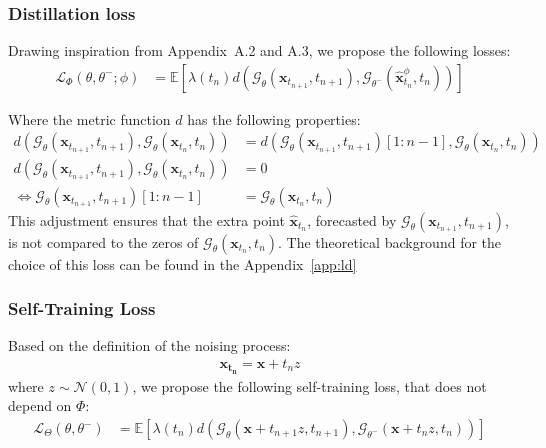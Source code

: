 \subsubsection{Distillation loss}
\noindent Drawing inspiration from \cite{song2023consistencymodels} Appendix~A.2 and A.3, we propose the following losses:
\begin{align}
    \mathcal{L}_{\Phi} \left(\theta, \theta^-; \phi \right) &= \mathbb{E}\left[ \lambda(t_n) d \left(\mathcal{G}_{\theta} (\mathbf{x}_{t_{n+1}}, t_{n+1}), \mathcal{G}_{\theta^-} (\widehat{\mathbf{x}}_{t_{n}}^{\phi}, t_{n}) \right)\right] \label{def:loss}
\end{align}

\noindent Where the metric function $d$ has the following properties:
\begin{align}
        d\left(\mathcal{G}_{\theta} (\mathbf{x}_{t_{n+1}}, t_{n+1}), \mathcal{G}_{\theta} (\mathbf{x}_{t_{n}}, t_{n})\right) &= d\left(\mathcal{G}_{\theta} (\mathbf{x}_{t_{n+1}}, t_{n+1})[1:n-1], \mathcal{G}_{\theta} (\mathbf{x}_{t_{n}}, t_{n})\right) \label{d:prop} \\
         d\left(\mathcal{G}_{\theta} (\mathbf{x}_{t_{n+1}}, t_{n+1}), \mathcal{G}_{\theta} (\mathbf{x}_{t_{n}}, t_{n})\right) & = 0 \\\Leftrightarrow \mathcal{G}_{\theta} (\mathbf{x}_{t_{n+1}}, t_{n+1})[1:n-1] & = \mathcal{G}_{\theta} (\mathbf{x}_{t_{n}}, t_{n})  \label{d:zero}
\end{align}
\noindent This adjustment ensures that the extra point $\widehat{\mathbf{x}}_{t_n}$, forecasted by $\mathcal{G}_{\theta} (\mathbf{x}_{t_{n+1}}, t_{n+1})$, is not compared to the zeros of $\mathcal{G}_{\theta} (\mathbf{x}_{t_{n}}, t_{n})$. The theoretical background for the choice of this loss can be found in the Appendix~\ref{app:ld}

\subsubsection{Self-Training Loss}

\noindent Based on the definition of the noising process:
\begin{align}
    \mathbf{x_{t_n}} = \mathbf{x} + t_nz \label{def:xtn}
\end{align}
\noindent where $z \sim \mathcal{N}(0, 1)$, we propose the following self-training loss, that does not depend on $\Phi$:
\begin{align}
    \mathcal{L}_{\Theta} \left(\theta, \theta^-\right) &= \mathbb{E}\left[ \lambda(t_n) d \left(\mathcal{G}_{\theta}(\mathbf{x} + t_{n+1}z, t_{n+1}), \mathcal{G}_{\theta^-}(\mathbf{x} + t_nz, t_{n}) \right)\right] \label{def:selfloss}
\end{align}

